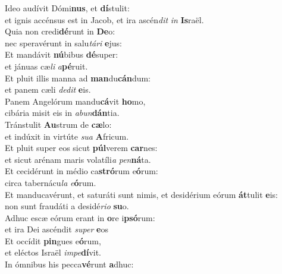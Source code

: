 \oddverse Ideo audívit Dómi\textbf{nus}, et \textbf{dí}stulit:~\*\\
\oddverse et ignis accénsus est in Jacob, et ira ascén\textit{dit} \textit{in} \textbf{Is}raël.\\
\evenverse Quia non credi\textbf{dé}runt in \textbf{De}o:~\*\\
\evenverse nec speravérunt in salu\textit{tá}\textit{ri} \textbf{e}jus:\\
\oddverse Et mandávit \textbf{nú}bibus \textbf{dé}super:~\*\\
\oddverse et jánuas cæ\textit{li} \textit{a}\textbf{pé}ruit.\\
\evenverse Et pluit illis manna ad \textbf{man}du\textbf{cán}dum:~\*\\
\evenverse et panem cæli \textit{de}\textit{dit} \textbf{e}is.\\
\oddverse Panem Angelórum mandu\textbf{cá}vit \textbf{ho}mo,~\*\\
\oddverse cibária misit eis in \textit{a}\textit{bun}\textbf{dán}tia.\\
\evenverse Tránstulit \textbf{Au}strum de \textbf{cæ}lo:~\*\\
\evenverse et indúxit in virtúte \textit{su}\textit{a} \textbf{A}fricum.\\
\oddverse Et pluit super eos sicut \textbf{púl}verem \textbf{car}nes:~\*\\
\oddverse et sicut arénam maris volatíli\textit{a} \textit{pen}\textbf{ná}ta.\\
\evenverse Et cecidérunt in médio ca\textbf{stró}rum e\textbf{ó}rum:~\*\\
\evenverse circa tabernácu\textit{la} \textit{e}\textbf{ó}rum.\\
\oddverse Et manducavérunt, et saturáti sunt nimis, et desidérium eórum \textbf{át}tulit \textbf{e}is:~\*\\
\oddverse non sunt fraudáti a desidé\textit{ri}\textit{o} \textbf{su}o.\\
\evenverse Adhuc escæ eórum erant in \textbf{o}re i\textbf{psó}rum:~\*\\
\evenverse et ira Dei ascéndit \textit{su}\textit{per} \textbf{e}os\\
\oddverse Et occídit \textbf{pin}gues e\textbf{ó}rum,~\*\\
\oddverse et eléctos Israël \textit{im}\textit{pe}\textbf{dí}vit.\\
\evenverse In ómnibus his pecca\textbf{vé}runt \textbf{a}dhuc:~\*\\
